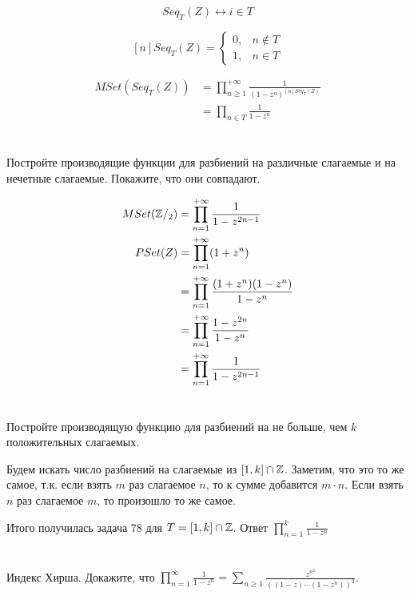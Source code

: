 $$Seq_T(Z) \leftrightarrow i\in T$$

$$[n]Seq_T(Z) = \begin{cases}
        0, & n\not\in T \\
        1, & n\in T
    \end{cases}$$

\begin{align*}
    MSet(Seq_T(Z)) & = \prod_{n \geq 1}^{+\infty} \frac{1}{(1 - z^n)^{[n]Seq_T(Z)}} \\
                   & = \prod_{n\in T} \frac{1}{1 - z^n}
\end{align*}

\section{}
Постройте производящие функции для разбиений на различные слагаемые и на нечетные слагаемые. Покажите, что они совпадают.

\begin{align*}
    MSet(\mathbb{Z} /_2) & = \prod_{n = 1}^{+\infty} \frac{1}{1 - z^{2n - 1}}           \\
    PSet(Z)      & = \prod_{n = 1}^{+\infty} (1 + z^n)                          \\
                 & = \prod_{n = 1}^{+\infty} \frac{(1 + z^n)(1 - z^n)}{1 - z^n} \\
                 & = \prod_{n = 1}^{+\infty} \frac{1 - z^{2n}}{1 - z^n}         \\
                 & = \prod_{n = 1}^{+\infty} \frac{1}{1 - z^{2n - 1}}           \\
\end{align*}

\section{}
Постройте производящую функцию для разбиений на не больше, чем $k$ положительных слагаемых.

Будем искать число разбиений на слагаемые из \([1, k]\cap \mathbb{Z}\). Заметим, что это то же самое, т.к. если взять \(m\) раз слагаемое \(n\), то к сумме добавится \(m\cdot n\). Если взять \(n\) раз слагаемое \(m\), то произошло то же самое.

Итого получилась задача 78 для \(T = [1, k]\cap \mathbb{Z}\). Ответ \(\prod_{n = 1}^{k} \frac{1}{1 - z^n}\)

\pagebreak

\section{}
Индекс Хирша. Докажите, что $\prod\limits_{n=1}^\infty\frac{1}{1-z^n}=\sum\limits_{n\ge 1}\frac{z^{n^2}}{((1-z)\cdots(1-z^n))^2}$.

